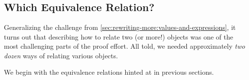 \subsection{Which Equivalence Relation?}\label{sec:rewriting-more:which-equivalence}
Generalizing the challenge from \autoref{sec:rewriting-more:values-and-expressions}, it turns out that describing how to relate two (or more!) objects was one of the most challenging parts of the proof effort.
All told, we needed approximately \emph{two dozen} ways of relating various objects.
%
%

We begin with the equivalence relations hinted at in previous sections.

